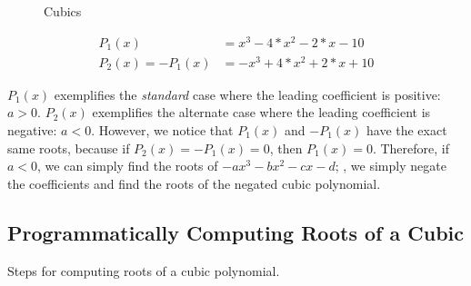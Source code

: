 \begin{figure}
  \centering

  \caption{Cubics}
  \label{fig.cubic}
\end{figure}

\begin{align*}
  P_1(x) &= x^3 - 4*x^2 - 2*x - 10\\
  P_2(x) = -P_1(x) &= -x^3 + 4*x^2 + 2*x + 10
\end{align*}

$P_1(x)$ exemplifies the \emph{standard} case where the leading coefficient is positive: $a>0$.
$P_2(x)$ exemplifies the alternate case where the leading coefficient is negative: $a<0$.
However, we notice that $P_1(x)$ and $-P_1(x)$ have the exact same roots, because if $P_2(x) = -P_1(x) = 0$,
then $P_1(x) = 0$.  Therefore, if $a<0$, we can simply find the roots of $-a x^3 -b x^2 - c x - d$;
\ie, we simply negate the coefficients and find the roots of the negated cubic polynomial.


\subsection{Programmatically Computing Roots of a Cubic}

Steps for computing roots of a cubic polynomial.

